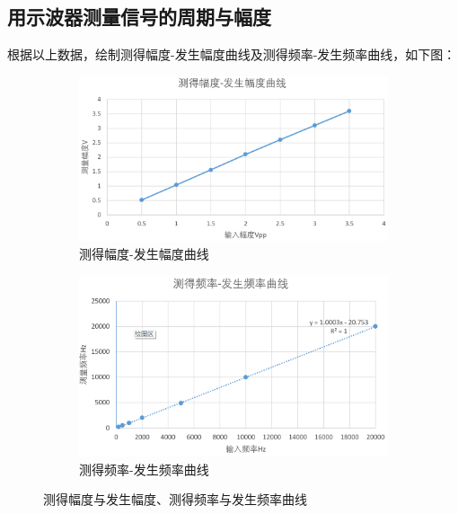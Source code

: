 \documentclass[12pt,a4paper]{article}
\begin{document}
	\subsection{用示波器测量信号的周期与幅度}
	根据以上数据，绘制测得幅度-发生幅度曲线及测得频率-发生频率曲线，如下图：
	\begin{figure}[H]
		\centering
		\begin{subfigure}[b]{0.4\textwidth}
			\centering
			\includegraphics[width=\textwidth]{测得幅度-发生幅度曲线.png}
			\caption{测得幅度-发生幅度曲线}
			\label{fig:chart-amplitude}
		\end{subfigure}
		\hfill
		\begin{subfigure}[b]{0.4\textwidth}
			\centering
			\includegraphics[width=\textwidth]{测得频率-发生频率曲线.png}
			\caption{测得频率-发生频率曲线}
			\label{fig:chart-frequency}
		\end{subfigure}
		\caption{测得幅度与发生幅度、测得频率与发生频率曲线}
		\label{fig:chart1}
	\end{figure}	
\end{document}
